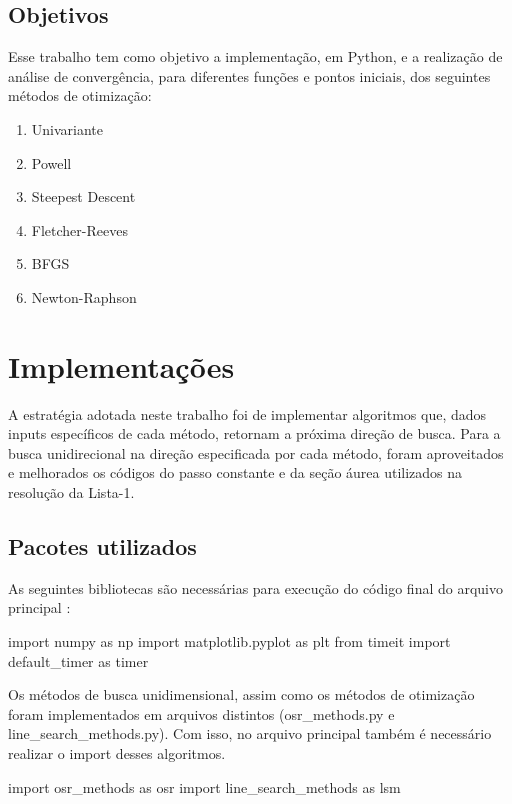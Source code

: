 \documentclass[10pt, a4paper]{article}
\begin{document}
\subsection{Objetivos}

Esse trabalho tem como objetivo a implementação, em Python, e a realização de análise de convergência, para diferentes funções e pontos iniciais, dos seguintes métodos de otimização:
\renewcommand{\theenumi}{\alph{enumi}}
\begin{enumerate}
  \item Univariante
  \item Powell
  \item Steepest Descent
  \item Fletcher-Reeves
  \item BFGS
  \item Newton-Raphson
\end{enumerate}

\section{Implementações}

A estratégia adotada neste trabalho foi de implementar algoritmos que, dados inputs específicos de cada método, retornam a próxima direção de busca. Para a busca unidirecional na direção especificada por cada método, 
foram aproveitados e melhorados os códigos do passo constante e da seção áurea utilizados na resolução da Lista-1.

\subsection{Pacotes utilizados}
As seguintes bibliotecas são necessárias para execução do código final do arquivo principal :

\begin{python}
  import numpy as np
  import matplotlib.pyplot as plt
  from timeit import default_timer as timer
\end{python}

Os métodos de busca unidimensional, assim como os métodos de otimização foram implementados em arquivos distintos (osr\_methods.py e line\_search\_methods.py). Com isso, no arquivo principal também é necessário realizar o import desses algoritmos.

\begin{python}
  import osr_methods as osr
  import line_search_methods as lsm
\end{python}
\end{document}
